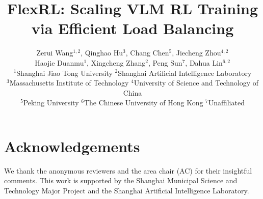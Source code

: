 \documentclass{article}
\title{FlexRL: Scaling VLM RL Training via Efficient Load Balancing}
\author{
\begin{tabular}[t]{@{}l@{}}
Zerui Wang$^{1,2}$, Qinghao Hu$^{3}$, Chang Chen$^{5}$, Jiecheng Zhou$^{4,2}$\\
Haojie Duanmu$^{1}$, Xingcheng Zhang$^{2}$, Peng Sun$^{7}$, Dahua Lin$^{6,2}$\\ 
{\normalfont $^{1}$Shanghai Jiao Tong University \quad $^{2}$Shanghai Artificial Intelligence Laboratory}\\
{\normalfont $^{3}$Massachusetts Institute of Technology \quad $^{4}$University of Science and Technology of China}\\
{\normalfont $^{5}$Peking University \quad $^{6}$The Chinese University of Hong Kong \quad $^{7}$Unaffiliated}
\end{tabular}
}
\begin{document}
\maketitle

\begin{abstract}

\end{abstract}











\newpage
\section*{Acknowledgements}
We thank the anonymous reviewers and the area chair (AC) for their insightful comments. This work is supported by the Shanghai Municipal Science and Technology Major Project and the Shanghai Artificial Intelligence Laboratory.





\end{document}
